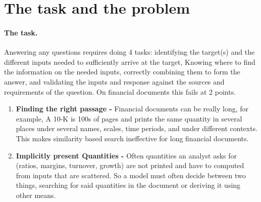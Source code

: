 \section{The task and the problem}
\label{sec:problem}

\paragraph{The task.}
Answering any  questions requires doing 4 tasks: identifying the target(s) and the different inputs needed to sufficiently arrive at the target, Knowing where to find the information on the needed inputs, correctly combining them to form the answer, and validating the inputs and response against the sources and requirements of the question. 
 On financial documents this fails at 2 points.

\begin{enumerate}
\item \textbf{Finding the right passage -} Financial documents can be really long, for example, A 10-K is 100s of pages and prints the same quantity in several places under several names, scales, time periods, and under different contexts. This makes similarity based search ineffective for long financial documents.
\item \textbf{Implicitly present Quantities -} Often quantities an analyst asks for (ratios, margins, turnover, growth) are not printed and have to  computed from inputs that are scattered. So a model must often decide between two things, searching for said quantities in the document or deriving it using other means.
\end{enumerate}




